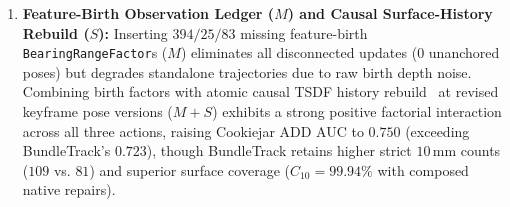 \documentclass[10pt,journal]{IEEEtran}
\begin{document}
\begin{enumerate}
    \item \textbf{Feature-Birth Observation Ledger ($M$) and Causal Surface-History Rebuild ($S$):} Inserting $394/25/83$ missing feature-birth \texttt{BearingRangeFactor}s ($M$) eliminates all disconnected updates ($0$ unanchored poses) but degrades standalone trajectories due to raw birth depth noise. Combining birth factors with atomic causal TSDF history rebuild~\cite{bundlefusion} at revised keyframe pose versions ($M+S$) exhibits a strong positive factorial interaction across all three actions, raising Cookiejar ADD AUC to $\mathbf{0.750}$ (exceeding BundleTrack's $0.723$), though BundleTrack retains higher strict $10\,\mathrm{mm}$ counts ($109$ vs. $81$) and superior surface coverage ($C_{10} = 99.94\%$ with composed native repairs).
\end{enumerate}
\end{document}
